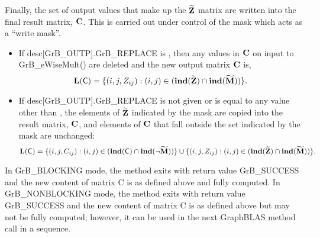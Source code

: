 Finally, the set of output values that make up the ${\bf \widetilde{Z}}$ 
matrix are written into the final result matrix, ${\bf C}$. 
This is carried out under control of the mask which acts as a ``write mask''.
\begin{itemize}
\item If {\sf desc[GrB\_OUTP].GrB\_REPLACE} is \true, then any values in ${\bf C}$ 
on input to {\sf GrB\_eWiseMult()} are deleted and the new output matrix ${\bf C}$ is,
\[ \bold{L}({\sf C}) = \{(i,j,Z_{ij}) : (i,j) \in (\bold{ind}({\bf \widetilde{Z}}) 
\cap \bold{ind}({\bf \widetilde{M}})) \}. \]

\item If {\sf desc[GrB\_OUTP].GrB\_REPLACE} is not given or is equal to any 
value other than \true, the elements of ${\bf \widetilde{Z}}$ indicated by 
the mask are copied into the result matrix, ${\bf C}$, and elements of 
${\bf C}$ that fall outside the set indicated by the mask are unchanged:
\[ \bold{L}({\sf C}) = \{(i,j,C_{ij}) : (i,j) \in (\bold{ind}({\bf \sf C}) 
\cap \bold{ind}(\neg {\bf \widetilde{M}})) \} \cup \{(i,j,Z_{ij}) : (i,j) \in 
(\bold{ind}({\bf \widetilde{Z}}) \cap \bold{ind}({\bf \widetilde{M}})) \}. \]
\end{itemize}

In {\sf GrB\_BLOCKING} mode, the method exits with return value 
{\sf GrB\_SUCCESS} and the new content of matrix {\sf C} is as defined above
and fully computed.  
In {\sf GrB\_NONBLOCKING} mode, the method exits with return value 
{\sf GrB\_SUCCESS} and the new content of matrix {\sf C} is as defined above 
but may not be fully computed; however, it can be used in the next GraphBLAS 
method call in a sequence.


